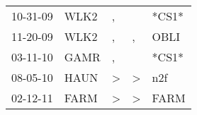\begin{supertabular}{lllll}
 10-31-09 &  WLK2 &             , &               &  *CS1* \\
 11-20-09 &  WLK2 &             , &             , &   OBLI \\
 03-11-10 &  GAMR &             , &               &  *CS1* \\
 08-05-10 &  HAUN &  \textgreater &  \textgreater &    n2f \\
 02-12-11 &  FARM &  \textgreater &  \textgreater &   FARM \\
\end{supertabular}
